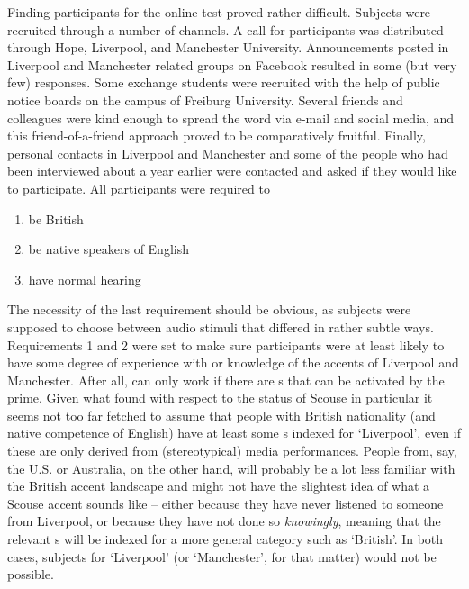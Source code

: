 Finding participants for the online test proved rather difficult.
Subjects were recruited through a number of channels.
A call for participants was distributed through Hope, Liverpool, and Manchester University.
Announcements posted in Liverpool and Manchester related groups on Facebook resulted in some (but very few) responses.
Some exchange students were recruited with the help of public notice boards on the campus of Freiburg University.
Several friends and colleagues were kind enough to spread the word via e-mail and social media, and this friend-of-a-friend approach proved to be comparatively fruitful.
Finally, personal contacts in Liverpool and Manchester and some of the people who had been interviewed about a year earlier were contacted and asked if they would like to participate.
All participants were required to
\begin{enumerate}
	\item be British
	\item be native speakers of English
	\item have normal hearing
\end{enumerate}
The necessity of the last requirement should be obvious, as subjects were supposed to choose between audio stimuli that differed in rather subtle ways.
Requirements 1 and 2 were set to make sure participants were at least likely to have some degree of experience with or knowledge of the accents of Liverpool and Manchester.
After all,   can only work if there are s that can be activated by the prime.
Given what \textcite{montgomery2007} found with respect to the status of Scouse in particular it seems not too far fetched to assume that people with British nationality (and native competence of English) have at least some s indexed for `Liverpool', even if these are only derived from (stereotypical) media performances.
People from, say, the U.S. or Australia, on the other hand, will probably be a lot less familiar with the British accent landscape and might not have the slightest idea of what a Scouse accent sounds like -- either because they have never listened to someone from Liverpool, or because they have not done so \emph{knowingly}, meaning that the relevant s will be indexed for a more general category such as `British'.
In both cases,  subjects for `Liverpool' (or `Manchester', for that matter) would not be possible.

